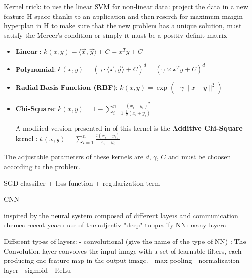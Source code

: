 Kernel trick:
to use the linear SVM for non-linear data: project the data in a new feature H space thanks to an application and then reserch for maximum margin hyperplan in H
to make sure that the new problem has a unique solution, 
must satisfy the Mercer's condition or simply it must be a positiv-definit matrix

\begin{itemize}
    \item \textbf{Linear} : $k(x, y) = \langle \vec{x} , \vec{y} \rangle + C = x^T y + C$
    \item \textbf{Polynomial}: $k(x, y) = (\gamma \cdot \langle \vec{x} , \vec{y} \rangle + C)^d = (\gamma \times x^T y + C)^d$
    \item \textbf{Radial Basis Function (RBF)}: $k(x, y) = \exp \left( - \gamma \lVert x - y \rVert ^2 \right)$
    \item \textbf{Chi-Square}: $\displaystyle k(x, y) = 1 - \sum_{i=1}^n \frac{(x_i-y_i)^2}{\frac{1}{2} (x_i+y_i)}$
    
    A modified version presented in \cite{Vedaldi2010} of this kernel is the \textbf{Additive Chi-Square} kernel :
    $\displaystyle k(x, y) = \sum_{i=1}^n \frac{2 (x_i - y_i)}{x_i + y_i} $
\end{itemize}

The adjustable parameters of these kernels are $d$, $\gamma$, $C$ and must be choosen according to the problem.

SGD classifier + loss function + regularization term%

CNN

inspired by the neural system composed of different layers and communication shemes
recent years: use of the adjectiv "deep" to qualify NN: many layers

Different types of layers:
- convolutional (give the name of the type of NN) : The Convolution layer convolves the input image with a set of learnable filters, each producing one feature map in the output image.
- max pooling
- normalization layer %
- sigmoid
- ReLu